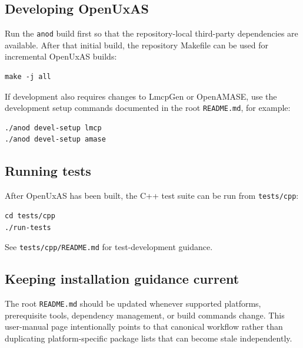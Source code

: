 \subsection{Developing OpenUxAS}\label{developing-openuxas}

Run the \texttt{anod} build first so that the repository-local third-party
dependencies are available. After that initial build, the repository Makefile
can be used for incremental OpenUxAS builds:

\begin{verbatim}
make -j all
\end{verbatim}

If development also requires changes to LmcpGen or OpenAMASE, use the
development setup commands documented in the root \texttt{README.md}, for
example:

\begin{verbatim}
./anod devel-setup lmcp
./anod devel-setup amase
\end{verbatim}

\subsection{Running tests}\label{running-tests}

After OpenUxAS has been built, the C++ test suite can be run from
\texttt{tests/cpp}:

\begin{verbatim}
cd tests/cpp
./run-tests
\end{verbatim}

See \texttt{tests/cpp/README.md} for test-development guidance.

\subsection{Keeping installation guidance current}\label{keeping-installation-guidance-current}

The root \texttt{README.md} should be updated whenever supported platforms,
prerequisite tools, dependency management, or build commands change. This
user-manual page intentionally points to that canonical workflow rather than
duplicating platform-specific package lists that can become stale
independently.
